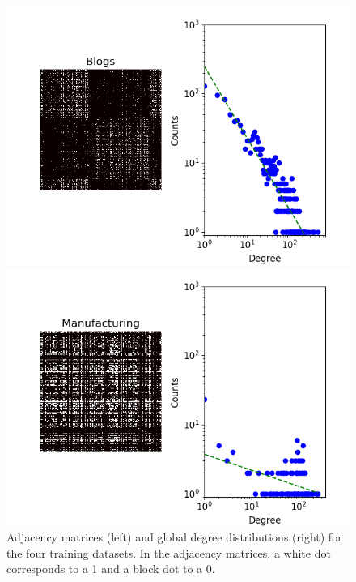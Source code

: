 \begin{figure}[h]
\begin{minipage}{0.24\textwidth}
            \includegraphics[width=\textwidth]{img/corpus/blogs_dd}
        \end{minipage}
        \begin{minipage}{0.24\textwidth}
            \includegraphics[width=\textwidth]{img/corpus/manufacturing_dd}
        \end{minipage}
	\caption{Adjacency matrices (left) and global degree distributions (right) for the four training datasets. In the adjacency matrices, a white dot corresponds to a 1 and a block dot to a 0.}
	\label{fig:corpuses}
\end{figure}

